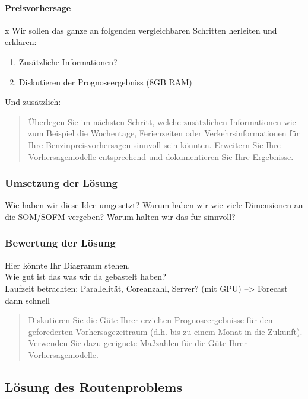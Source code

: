 \documentclass[11pt]{article}
\begin{document}
	\paragraph{Preisvorhersage\\}
	
	
	
	
	x
	\newline
	\newline
	Wir sollen das ganze an folgenden vergleichbaren Schritten herleiten und erklären:
	\begin{enumerate}

		\item Zusätzliche Informationen?
		\item Diskutieren der Prognoseergebniss (8GB RAM)
	\end{enumerate}
	
	Und zusätzlich:
	\begin{quote}
		Überlegen Sie im nächsten Schritt, welche zusätzlichen Informationen wie zum Beispiel die Wochentage, Ferienzeiten oder Verkehrsinformationen für Ihre Benzinpreisvorhersagen sinnvoll sein könnten. Erweitern Sie Ihre Vorhersagemodelle entsprechend und dokumentieren Sie Ihre Ergebnisse.
	\end{quote}
\subsubsection{Umsetzung der Lösung}
	Wie haben wir diese Idee umgesetzt? Warum haben wir wie viele Dimensionen an die SOM/SOFM vergeben? Warum halten wir das für sinnvoll?
\subsubsection{Bewertung der Lösung}
	Hier könnte Ihr Diagramm stehen. \\
	Wie gut ist das was wir da gebastelt haben?\\
	Laufzeit  betrachten: Parallelität, Coreanzahl, Server? (mit GPU) --> Forecast dann schnell
	\begin{quote}
		Diskutieren Sie die Güte Ihrer erzielten Prognoseergebnisse für den geforederten Vorhersagezeitraum (d.h. bis zu einem Monat in die Zukunft). Verwenden Sie dazu geeignete Maßzahlen für die Güte Ihrer Vorhersagemodelle. 
	\end{quote}
\subsection{Lösung des Routenproblems}
\end{document}
